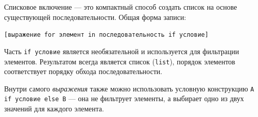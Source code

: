 \documentclass[a4,12pt]{article}
\theoremstyle{remark}
\begin{document}
\begin{exercisenote}[title=Синтаксис]
Списковое включение — это компактный способ создать список на основе
существующей последовательности. Общая форма записи:
\begin{center}
    \texttt{[выражение\ for\ элемент\ in\ последовательность\ if\ условие]}
\end{center}
Часть \texttt{if~условие} является необязательной и используется для фильтрации
элементов. Результатом всегда является список (\texttt{list}), порядок элементов
соответствует порядку обхода последовательности.

Внутри самого \emph{выражения} также можно использовать условную конструкцию
\texttt{A if условие else B} — она не фильтрует элементы, а выбирает одно из
двух значений для каждого элемента.
\end{exercisenote}
\end{document}

